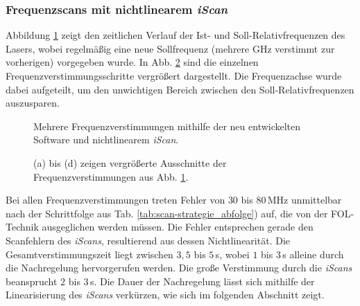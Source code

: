 \subsubsection{Frequenzscans mit nichtlinearem
\textit{iScan}}\label{subsubsec:frequenz_scans_nichtlineares_iScan}
Abbildung \ref{fig:laserscan_LUT-reset} zeigt den zeitlichen Verlauf der
Ist- und Soll-Relativfrequenzen des Lasers, wobei regelmäßig eine neue
Sollfrequenz (mehrere GHz verstimmt zur vorherigen) vorgegeben
wurde. In Abb. \ref{fig:laserscan_LUT-reset_zoom} sind die einzelnen
Frequenzverstimmungsschritte vergrößert dargestellt. Die Frequenzachse wurde
dabei aufgeteilt, um den unwichtigen Bereich zwischen den
Soll-Relativfrequenzen auszusparen.
\begin{figure}[h]
	 	\centering
	 	\footnotesize
		
		\caption[Frequenzscan, nichtlineares \textit{iScan}]{Mehrere
		Frequenzverstimmungen mithilfe der neu entwickelten Software und nichtlinearem
		\textit{iScan}.}
		\label{fig:laserscan_LUT-reset}
\end{figure}
\begin{figure}[hp]
 	\centering
 	\footnotesize
	\caption[Frequenzscan, nichtlineares \textit{iScan}, vergrößert]{(a) bis (d)
	zeigen vergrößerte Ausschnitte der Frequenzverstimmungen aus Abb.
	\ref{fig:laserscan_LUT-reset}.}
	\label{fig:laserscan_LUT-reset_zoom}
\end{figure}
Bei allen Frequenzverstimmungen treten Fehler von $30$ bis $80\,$MHz unmittelbar
nach der Schrittfolge aus Tab.
\ref{tab:scan-strategie_abfolge}) auf, die von der FOL-Technik ausgeglichen
werden müssen. Die Fehler entsprechen gerade den Scanfehlern des
\textit{iScans}, resultierend aus dessen Nichtlinearität. Die Gesamtverstimmungszeit liegt
zwischen $3,5$ bis $5\,$s, wobei $1$ bis $3\,$s alleine durch die Nachregelung
hervorgerufen werden. Die große Verstimmung durch die \textit{iScans}
beansprucht $2$ bis $3\,$s. Die Dauer der Nachregelung lässt sich mithilfe
der Linearisierung des \textit{iScans} verkürzen, wie sich im folgenden Abschnitt zeigt.


